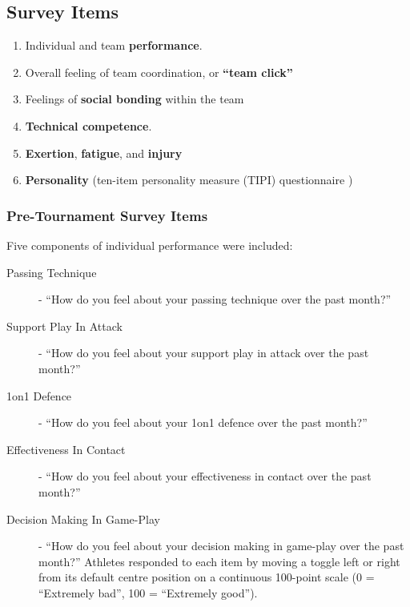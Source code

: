   \subsection{\label{app5:surveyItems}Survey Items}

  \begin{enumerate}
  \item Individual and team \textbf{performance}.
  \item Overall feeling of team coordination, or \textbf{``team click''}
  \item Feelings of \textbf{social bonding} within the team
  \item \textbf{Technical competence}.
  \item \textbf{Exertion}, \textbf{fatigue}, and \textbf{injury}
  \item \textbf{Personality} (ten-item personality measure (TIPI) questionnaire  \citep{Gosling2003})
  \end{enumerate}


    \subsubsection{\label{app5:surveyPre}Pre-Tournament Survey Items}



Five components of individual performance were included:
\begin{description}
\item[Passing Technique] - ``How do you feel about your passing technique over the past month?''
\item[Support Play In Attack] - ``How do you feel about your support play in attack over the past month?''
\item[1on1 Defence] - ``How do you feel about your 1on1 defence over the past month?''
\item[Effectiveness In Contact] - ``How do you feel about your effectiveness in contact over the past month?''
\item[Decision Making In Game-Play] - ``How do you feel about your decision making in game-play over the past month?''
Athletes responded to each item by moving a toggle left or right from its default centre position on a continuous 100-point scale (0 = ``Extremely bad'', 100 = ``Extremely good'').
\end{description}

